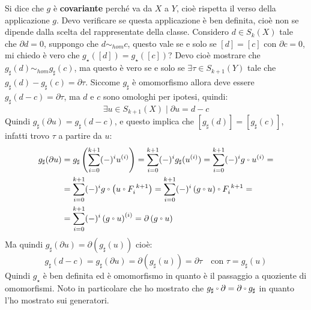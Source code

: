 \documentclass[10pt, twoside=false, x11names]{scrbook}
\let\latexcirc=\circ
\newcommand{\ccirc}{\mathbin{\mathchoice
  {\xcirc\scriptstyle}
  {\xcirc\scriptstyle}
  {\xcirc\scriptscriptstyle}
  {\xcirc\scriptscriptstyle}
}}
\newcommand{\xcirc}[1]{\vcenter{\hbox{$#1\latexcirc$}}}
\let\circ\ccirc
\begin{document}
Si dice che $ g $ è \textbf{covariante} perché va da $ X $ a $ Y $,
cioè rispetta il verso della applicazione $ g $.
Devo verificare se questa applicazione è ben definita, cioè non se
dipende dalla scelta del rappresentate della classe.
Considero $ d \in S_k(X) $ tale che $ \partial d = 0 $, suppongo
che $ d \sim_{hom} c $, questo vale se e solo se $ [d] = [c] $ con $ \partial c = 0 $,
mi chiedo è vero che $ g_\star([d]) = g_\star([c]) $?
Devo cioè mostrare che $ g_\sharp (d) \sim_{hom} g_\sharp (c) $, ma questo è vero
se e solo se $ \exists \tau \in S_{k+1}(Y) $ tale che $ g_\sharp(d) - g_\sharp (c) = \partial \tau $.
Siccome $ g_\sharp $ è omomorfismo allora deve essere $ g_\sharp (d - c) = \partial \tau $,
ma $ d $ e $ c $ sono omologhi per ipotesi, quindi:
\[
  \exists u \in S_{k+1}(X) \; | \; \partial u = d - c
\]
Quindi $ g_\sharp(\partial u) = g_\sharp (d - c) $, e questo implica che $ [g_\sharp (d)] = [g_\sharp(c)] $, infatti
trovo $ \tau $ a partire da $ u $:
\begin{align*}
  g_\sharp (\partial u) & = g_\sharp \left(\sum_{i = 0}^{k+1} (-)^i u^{(i)}\right) = \sum_{i=0}^{k+1}(-)^i g_\sharp (u^{(i)}) =
                          \sum_{i=0}^{k+1}(-)^i g \circ u^{(i)} = \\
                        & = \sum_{i = 0}^{k+1} (-)^i g \circ \left( u \circ F_i^{\; k+1} \right) =
                          \sum_{i = 0}^{k+1} (-)^i  \left( g \circ u \right) \circ F_i^{\; k+1} = \\
                        & = \sum_{i = 0}^{k+1}(-)^i \left( g \circ u \right)^{(i)} = \partial \left( g \circ u \right)
\end{align*}
Ma quindi $ g_\sharp(\partial u) = \partial (g_\sharp (u)) $ cioè:
\[
  g_\sharp(d-c) = g_\sharp (\partial u) = \partial (g_\sharp (u)) = \partial \tau \quad \text{con } \tau = g_\sharp(u)
\]
Quindi $ g_\star $ è ben definita ed è omomorfismo in quanto
è il passaggio a quoziente di omomorfismi.
Noto in particolare che ho mostrato che $ g_\sharp \circ \partial = \partial \circ g_\sharp $
in quanto l'ho mostrato sui generatori.
\end{document}
